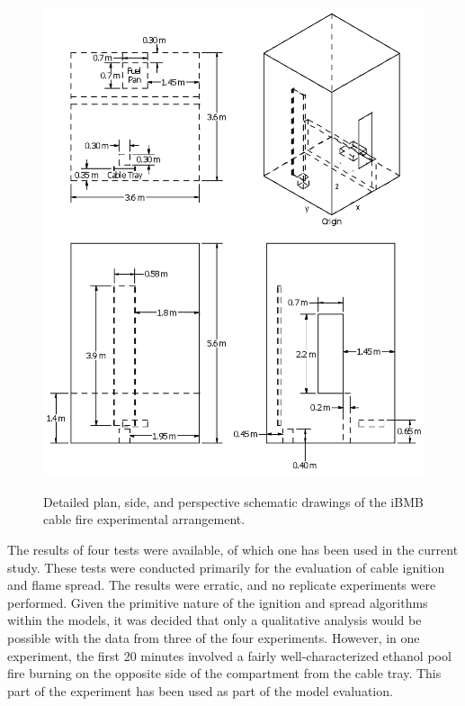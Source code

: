 \begin{figure}
\begin{center}
\includegraphics[width=6.5in]{FIGURES/iBMB/iBMB_Cable}\\
\end{center}
\caption{Detailed plan, side, and perspective schematic drawings of the iBMB cable fire experimental arrangement.}
 \label{fig:iBMB_Cable_Detailed}
\end{figure}

The results of four tests were
available, of which one has been used in the current study.
These tests were conducted primarily for the evaluation of cable ignition and flame spread.
The results were erratic, and no replicate experiments were performed. Given the primitive
nature of the ignition and spread algorithms within the models, it was decided that only
a qualitative analysis would be possible with the data from three of the four experiments.
However, in one experiment, the first 20 minutes involved a fairly well-characterized ethanol
pool fire burning on the opposite side of the compartment from the cable tray. This part of
the experiment has been used as part of the model evaluation.

